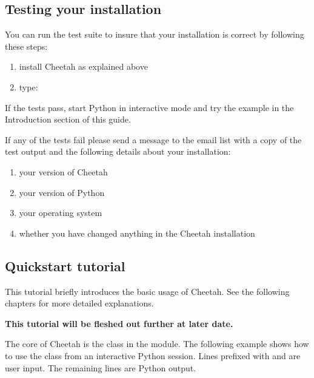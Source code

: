 \subsection{Testing your installation}
\label{gettingStarted.test}

You can run the test suite to insure that your installation is correct by
following these steps:
\begin{enumerate}
\item install Cheetah as explained above
\item type:  
\end{enumerate}

If the tests pass, start Python in interactive mode and try the example in the
Introduction section of this guide.

If any of the tests fail please send a message to the email list with a copy of
the test output and the following details about your installation:

\begin{enumerate}
\item your version of Cheetah
\item your version of Python
\item your operating system
\item whether you have changed anything in the Cheetah installation
\end{enumerate}

\subsection{Quickstart tutorial}
\label{gettingStarted.tutorial}

This tutorial briefly introduces the basic usage of Cheetah.  See the
following chapters for more detailed explanations.  

{\bf This tutorial will be fleshed out further at later date.} 

The core of Cheetah is the  class in the 
module. The following example shows how to use the  class from an
interactive Python session. Lines prefixed with \code{>>>} and  are
user input.  The remaining lines are Python output.

